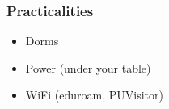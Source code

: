 \begin{frame}
\frametitle{Practicalities}

\begin{itemize}
\item Dorms
\item Power (under your table)
\item WiFi (eduroam, PUVisitor)
\end{itemize}

\end{frame}



